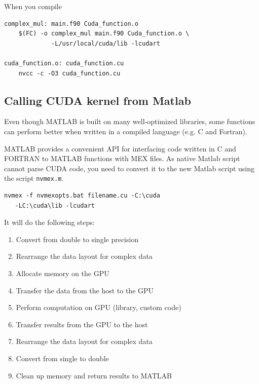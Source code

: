 When you compile
\begin{verbatim}
complex_mul: main.f90 Cuda_function.o
    $(FC) -o complex_mul main.f90 Cuda_function.o \
             -L/usr/local/cuda/lib -lcudart

cuda_function.o: cuda_function.cu
    nvcc -c -O3 cuda_function.cu
\end{verbatim}

\subsection{Calling CUDA kernel from Matlab}
\label{sec:calling-cuda-kernel-1}


Even though MATLAB is built on many well-optimized libraries, some
functions can perform better when written in a compiled language
(e.g. C and Fortran).

MATLAB provides a convenient API for interfacing code written in C and
FORTRAN to MATLAB functions with MEX files. As native Matlab script
cannot parse CUDA code, you need to convert it to the new Matlab
script using the script \verb!nvmex.m!.
\begin{verbatim}
nvmex -f nvmexopts.bat filename.cu -C:\cuda
   -LC:\cuda\lib -lcudart
\end{verbatim}
It will do the following steps:
\begin{enumerate}
\item Convert from double to single precision
\item Rearrange the data layout for complex data
\item Allocate memory on the GPU
\item Transfer the data from the host to the GPU
\item Perform computation on GPU (library, custom code)
\item Transfer results from the GPU to the host
\item Rearrange the data layout for complex data
\item Convert from single to double
\item Clean up memory and return results to MATLAB
\end{enumerate}

